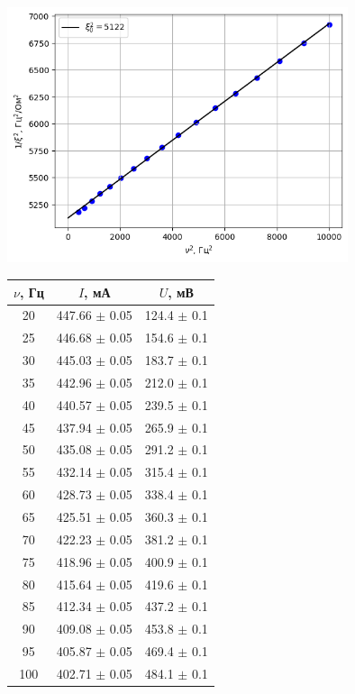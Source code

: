 \begin{figure}[h!]
    \begin{minipage}{0.5\linewidth}
        \centering
        \includegraphics[width=10cm]{images/plot1.png}
        \label{fig:plot1}
    \end{minipage}
    \begin{minipage}{0.6\linewidth}
        \centering
        \begin{tabular}{|c|c|c|}
            \hline
            $\nu$, Гц & $I$, мА & $U$, мВ\\\hline
            20 & 447.66 $\pm$ 0.05 & 124.4 $\pm$ 0.1\\\hline
            25 & 446.68 $\pm$ 0.05 & 154.6 $\pm$ 0.1\\\hline
            30 & 445.03 $\pm$ 0.05 & 183.7 $\pm$ 0.1\\\hline
            35 & 442.96 $\pm$ 0.05 & 212.0 $\pm$ 0.1\\\hline
            40 & 440.57 $\pm$ 0.05 & 239.5 $\pm$ 0.1\\\hline
            45 & 437.94 $\pm$ 0.05 & 265.9 $\pm$ 0.1\\\hline
            50 & 435.08 $\pm$ 0.05 & 291.2 $\pm$ 0.1\\\hline
            55 & 432.14 $\pm$ 0.05 & 315.4 $\pm$ 0.1\\\hline
            60 & 428.73 $\pm$ 0.05 & 338.4 $\pm$ 0.1\\\hline
            65 & 425.51 $\pm$ 0.05 & 360.3 $\pm$ 0.1\\\hline
            70 & 422.23 $\pm$ 0.05 & 381.2 $\pm$ 0.1\\\hline
            75 & 418.96 $\pm$ 0.05 & 400.9 $\pm$ 0.1\\\hline
            80 & 415.64 $\pm$ 0.05 & 419.6 $\pm$ 0.1\\\hline
            85 & 412.34 $\pm$ 0.05 & 437.2 $\pm$ 0.1\\\hline
            90 & 409.08 $\pm$ 0.05 & 453.8 $\pm$ 0.1\\\hline
            95 & 405.87 $\pm$ 0.05 & 469.4 $\pm$ 0.1\\\hline
            100& 402.71 $\pm$ 0.05 & 484.1 $\pm$ 0.1\\\hline
        \end{tabular}
    \end{minipage}
\end{figure}
